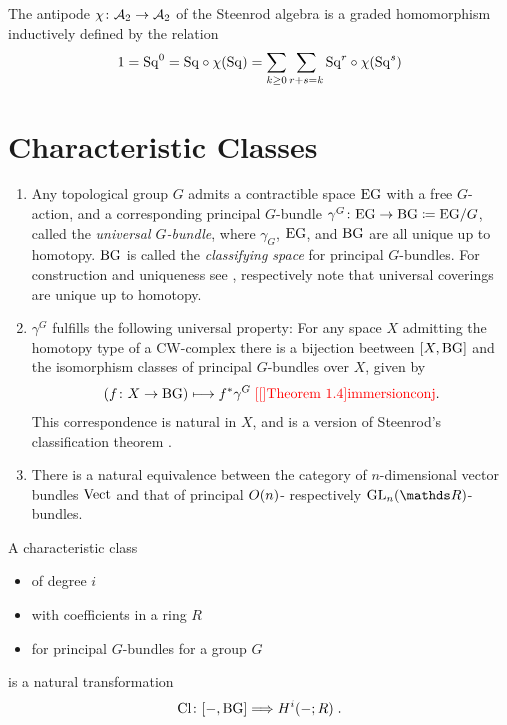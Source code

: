 \begin{Def}\label{def:antipode}
  The antipode $\chi\colon \mathcal{A}_2\to\mathcal{A}_2$ of the Steenrod algebra is a
  graded homomorphism inductively defined by the relation
  \begin{gather*}
    1 = \mathrm{Sq}^{0}
    = \mathrm{Sq} \circ \chi(\mathrm{Sq})
    = \sum_{k\geq0}\sum_{r+s=k} \mathrm{Sq}^{r} \circ \chi(\mathrm{Sq}^{s})
  \end{gather*}
\end{Def}

\section{Characteristic Classes}
\begin{Def}\label{def:charcls}
  \begin{enumerate}
  \item Any topological group $G$ admits a contractible space $\mathrm{E}\mathrm{G}$ with a
    free $G$-action, and a corresponding principal $G$-bundle
    $\gamma^G\colon \mathrm{E}\mathrm{G}\to\mathrm{BG}\coloneqq \mathrm{E}\mathrm{G}/G$, called the
    \emph{universal $G$-bundle},
    where $\gamma_G$, $\mathrm{E}\mathrm{G}$, and $\mathrm{BG}$ are all unique up to
    homotopy.
    $\mathrm{BG}$ is called the \emph{classifying space} for principal
    $G$-bundles.
    For construction and uniqueness see \cite[Example~1B.7~ff.]{hatcher},
    respectively note that universal coverings are unique up to homotopy.
  \item\label{item:classificationthm}
    $\gamma^G$ fulfills the following universal property:
    For any space $X$ admitting the homotopy type of a CW-complex
    there is a bijection beetween $[X,\mathrm{BG}]$ and the isomorphism classes of
    principal $G$-bundles over $X$, given by
    \begin{gather*}
      \left(f\colon X\to\BG \right) \longmapsto \pb f \gamma^G
      \;
      \text{\optcite[Theorem 1.4]{immersionconj}}.
    \end{gather*}
    This correspondence is natural in $X$, and is a version of
    Steenrod's classification theorem
    \cite[Theorem~14.4.1]{tomdieck}.
  \item There is a natural equivalence between the category of
    $n$-dimensional vector bundles $\mathrm{Vect}$ and that of principal
    $O(n)$- respectively $\GL n$-bundles.
  \end{enumerate}
\end{Def}

\begin{Def}
  A characteristic class
  \begin{itemize}
  \item of degree $i$
  \item with coefficients in a ring $R$
  \item for principal $G$-bundles for a group $G$
  \end{itemize}
  is a natural transformation
  \begin{gather*}
    \mathrm{Cl}\colon [-, \mathrm{BG}] \Longrightarrow H^i(-; R)\;.
  \end{gather*}
\end{Def}

